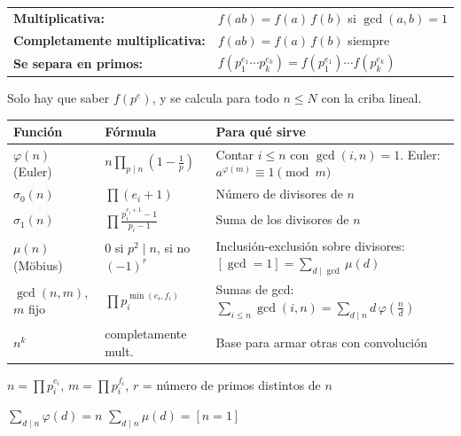 \begin{center}
\renewcommand{\arraystretch}{1.8}
\begin{tabular}{ll}
	\textbf{Multiplicativa:} & $f(ab) = f(a)\,f(b)$ \; si $\gcd(a,b) = 1$ \\
	\textbf{Completamente multiplicativa:} & $f(ab) = f(a)\,f(b)$ \; siempre \\
	\textbf{Se separa en primos:} & $f(p_1^{e_1} \cdots p_k^{e_k}) = f(p_1^{e_1}) \cdots f(p_k^{e_k})$ \\
\end{tabular}

Solo hay que saber $f(p^e)$, y se calcula para todo $n \le N$ con la criba lineal.
\end{center}

\begin{center}
\renewcommand{\arraystretch}{1.9}\setlength{\tabcolsep}{6pt}
\begin{tabular}{llp{150pt}}
	\textbf{Funci\'on} & \textbf{F\'ormula} & \textbf{Para qu\'e sirve} \\ \hline
	$\varphi(n)$ (Euler) & $n \prod_{p \mid n} \left(1 - \frac{1}{p}\right)$ & \raggedright Contar $i \le n$ con $\gcd(i,n)=1$. Euler: $a^{\varphi(m)} \equiv 1 \pmod m$ \tabularnewline
	$\sigma_0(n)$ & $\prod (e_i + 1)$ & \raggedright N\'umero de divisores de $n$ \tabularnewline
	$\sigma_1(n)$ & $\prod \frac{p_i^{e_i+1} - 1}{p_i - 1}$ & \raggedright Suma de los divisores de $n$ \tabularnewline
	$\mu(n)$ (M\"obius) & $0$ si $p^2 \mid n$, si no $(-1)^{r}$ & \raggedright Inclusi\'on-exclusi\'on sobre divisores: $[\gcd = 1] = \sum_{d \mid \gcd} \mu(d)$ \tabularnewline
	$\gcd(n, m)$, $m$ fijo & $\prod p_i^{\min(e_i, f_i)}$ & \raggedright Sumas de gcd: $\sum_{i \le n} \gcd(i,n) = \sum_{d \mid n} d\,\varphi(\frac{n}{d})$ \tabularnewline
	$n^k$ & completamente mult. & \raggedright Base para armar otras con convoluci\'on \tabularnewline
\end{tabular}
\end{center}

\begin{center}
$n = \prod p_i^{e_i}$, \; $m = \prod p_i^{f_i}$, \; $r$ = n\'umero de primos distintos de $n$

$\sum_{d \mid n} \varphi(d) = n$ \qquad $\sum_{d \mid n} \mu(d) = [n = 1]$
\end{center}
